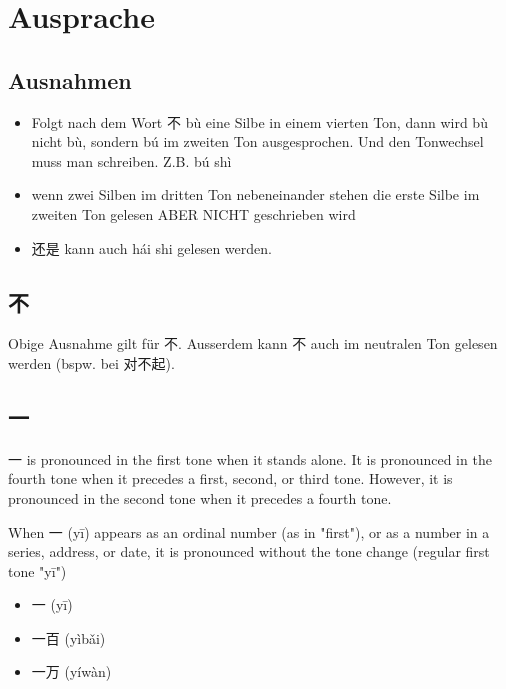 \documentclass[UTF8]{ctexart}
\begin{document}



\section{Ausprache}

\subsection{Ausnahmen}

\begin{itemize}
    \item Folgt nach dem Wort 不 bù eine Silbe in einem vierten Ton, dann wird bù nicht bù,
    sondern bú im zweiten Ton ausgesprochen. Und den Tonwechsel muss man
    schreiben. Z.B. bú shì
    \item wenn zwei Silben im dritten Ton nebeneinander stehen die erste Silbe im zweiten
    Ton gelesen ABER NICHT geschrieben wird
    \item 还是 kann auch hái shi gelesen werden.
\end{itemize}

\subsection{不}

Obige Ausnahme gilt für 不. Ausserdem kann 不 auch im neutralen Ton gelesen werden (bspw. bei 对不起).

\subsection{一}

一 is pronounced in the first tone when it stands alone. It is pronounced in the fourth tone when it precedes a first, second, or third tone. However, it is pronounced in the second tone when it precedes a fourth tone.

When 一 (yī) appears as an ordinal number (as in "first"), or as a number in a series, address, or date, it is pronounced without the tone change (regular first tone "yī")

\begin{itemize}
    \item 一 (yī)
    \item 一百 (yìbǎi)
    \item 一万 (yíwàn)
\end{itemize}
\end{document}
